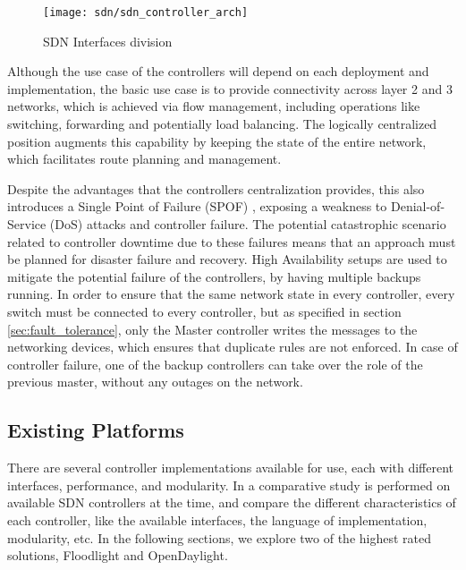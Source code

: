 \begin {enumerate}
\begin {enumerate}
\begin{figure}[!tbph]
  \centering
  \texttt{[image: sdn/sdn\_controller\_arch]}
  \label{fig:sdn_controller_arch}
  \caption {SDN Interfaces division}
\end{figure}

\par Although the use case of the controllers will depend on each deployment and implementation, the basic use case is to provide connectivity across layer 2 and 3 networks, which is achieved via flow management, including operations like
switching, forwarding and potentially load balancing. The logically centralized position augments this capability by keeping the state of the entire network, which facilitates route planning and management. 

\par Despite the advantages that the controllers centralization provides, this also introduces a Single Point of Failure (SPOF) \cite{ CITE - https://arxiv.org/pdf/1308.6138.pdf}, exposing a weakness to Denial-of-Service (DoS) attacks and 
controller failure. The potential catastrophic scenario related to controller downtime due to these failures means that an approach must be planned for disaster failure and recovery. High Availability setups are used to mitigate the potential
failure of the controllers, by having multiple backups running. In order to ensure that the same network state in every controller, every switch must be connected to every controller, but as specified in section \ref{sec:fault_tolerance}, only the Master 
controller writes the messages to the networking devices, which ensures that duplicate rules are not enforced. In case of controller failure, one of the backup controllers can take over the role of the previous master, without any outages on
the network.

\subsection{Existing Platforms}

There are several controller implementations available for use, each with different interfaces, performance, and modularity. In \cite{CITE - https://pdfs.semanticscholar.org/1fae/98c9d3bed22a539155d5e93a8d420bd22837.pdf} a comparative study is
performed on available SDN controllers at the time, and compare the different characteristics of each controller, like the available interfaces, the language of implementation, modularity, etc. In the following sections, we explore two of the 
highest rated solutions, Floodlight and OpenDaylight.


\end{enumerate}
\end{enumerate}
